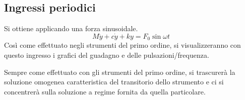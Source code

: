 \documentclass[a4paper, 15pt]{article}
\begin{document}
\subsection{Ingressi periodici} 	
\begin{adjustwidth}{2in}{}
			Si ottiene applicando una forza sinusoidale. 
			\[ M\ddot{y} + c\dot{y} + ky =F_0\sin\omega t\]
			Così come effettuato negli strumenti del primo ordine, si visualizzeranno con questo ingresso i grafici del guadagno e delle pulsazioni/frequenza. 
			
			Sempre come effettuato con gli strumenti del primo ordine, si trascurerà la soluzione omogenea caratteristica del transitorio dello strumento e ci si concentrerà sulla soluzione a regime fornita da quella particolare. \newline
			

\end{adjustwidth}
\end{document}

